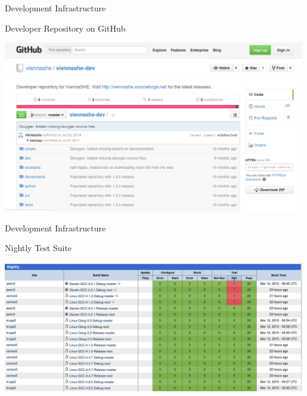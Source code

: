 \documentclass[usepdftitle=false,10pt]{beamer}
\begin{document}
\begin{frame}{Development Infrastructure}
  \begin{block}{Developer Repository on GitHub}
   \begin{center}
    \includegraphics[width=0.99\textwidth]{figures/viennashe-github}
   \end{center}
  \end{block}
\end{frame}

\begin{frame}{Development Infrastructure}
  \begin{block}{Nightly Test Suite}
   \begin{center}
    \includegraphics[width=0.99\textwidth]{figures/viennashe-nightly}
   \end{center}
  \end{block}
\end{frame}
\end{document}
